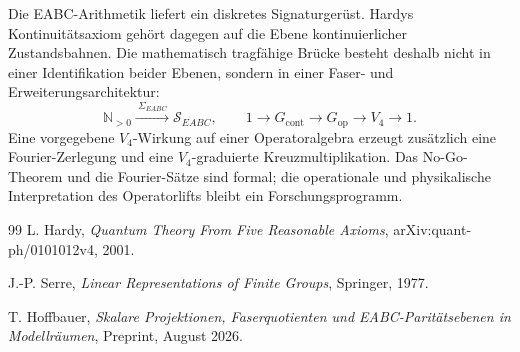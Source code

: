 \documentclass[11pt,a4paper,reqno]{amsart}
\theoremstyle{definition}
\theoremstyle{remark}
\newcommand{\N}{\mathbb{N}}
\newcommand{\SEABC}{\mathcal{S}_{EABC}}
\begin{document}
Die EABC-Arithmetik liefert ein diskretes Signaturgerüst. Hardys Kontinuitätsaxiom gehört dagegen auf die Ebene kontinuierlicher Zustandsbahnen. Die mathematisch tragfähige Brücke besteht deshalb nicht in einer Identifikation beider Ebenen, sondern in einer Faser- und Erweiterungsarchitektur:
\begin{equation}
\N_{>0}
\xrightarrow{\ \Sigma_{EABC}\ }
\SEABC,
\qquad
1\longrightarrow G_{\mathrm{cont}}
\longrightarrow G_{\mathrm{op}}
\longrightarrow V_4
\longrightarrow1.
\end{equation}
Eine vorgegebene $V_4$-Wirkung auf einer Operatoralgebra erzeugt zusätzlich eine Fourier-Zerlegung und eine $V_4$-graduierte Kreuzmultiplikation. Das No-Go-Theorem und die Fourier-Sätze sind formal; die operationale und physikalische Interpretation des Operatorlifts bleibt ein Forschungsprogramm.

\begin{thebibliography}{99}
L. Hardy,
\emph{Quantum Theory From Five Reasonable Axioms},
arXiv:quant-ph/0101012v4, 2001.

J.-P. Serre,
\emph{Linear Representations of Finite Groups},
Springer, 1977.

T. Hoffbauer,
\emph{Skalare Projektionen, Faserquotienten und EABC-Paritätsebenen in Modellräumen},
Preprint, August 2026.
\end{thebibliography}
\end{document}
